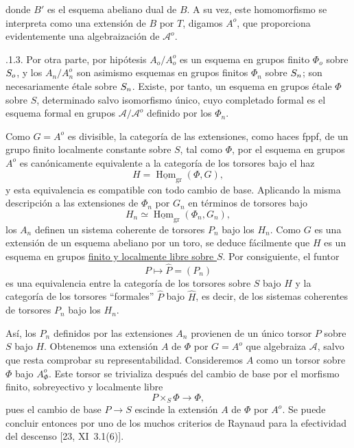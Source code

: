 
donde $B'$ es el esquema abeliano dual de $B$. A su vez, este
homomorfismo se interpreta como una extensión de $B$ por $T$, digamos
$A^o$, que proporciona evidentemente una algebraización de
$\mathcal A^o$.

\medskip
{}.1.3. Por otra parte, por hipótesis $A_o/A_o^o$ es un esquema en
grupos finito $\Phi_o$ sobre $\sisi{S}{S_o}$, y los $A_n/A_n^o$ son
asimismo esquemas en grupos finitos $\Phi_n$ sobre $\sisi{S}{S_n}$;
son necesariamente étale sobre $\sisi{S}{S_n}$. Existe, por tanto, un
esquema en grupos étale $\Phi$ sobre $S$, determinado salvo isomorfismo
único, cuyo completado formal es el esquema formal en grupos
$\mathcal A/\mathcal A^o$ definido por los $\Phi_n$.

Como $G=A^o$ es divisible, la categoría de las extensiones, como haces
fppf, de un grupo finito localmente constante sobre $S$, tal como
$\Phi$, por el esquema en grupos $A^o$ es canónicamente equivalente a
la categoría de los torsores bajo el haz
\[
 H=\underline{\operatorname{Hom}}_{\mathrm{gr}}(\Phi,G),
\]
y esta equivalencia es compatible con todo cambio de base. Aplicando la
misma descripción a las extensiones de $\Phi_n$ por $G_n$ en términos
de torsores bajo
\[
 H_n\simeq
 \underline{\operatorname{Hom}}_{\mathrm{gr}}(\Phi_n,G_n),
\]
los $A_n$ definen un sistema coherente de torsores $P_n$ bajo los
$H_n$. Como $G$ es una extensión de un esquema abeliano por un toro, se
deduce fácilmente que $H$ es un esquema en grupos \underline{finito y
localmente libre sobre $S$}. Por consiguiente, el funtor
\[
 P\longmapsto\widehat P=(P_n)
\]
es una equivalencia entre la categoría de los torsores sobre $S$ bajo
$H$ y la categoría de los torsores ``formales'' $\widehat P$ bajo
$\widehat H$, es decir, de los sistemas coherentes de torsores $P_n$
bajo los $H_n$.


Así, los $P_n$ definidos por las extensiones $A_n$ provienen de un
único torsor $P$ sobre $S$ bajo $H$. Obtenemos una extensión $A$ de
$\Phi$ por $G=A^o$ que algebraiza $\mathcal A$, salvo que resta comprobar
su representabilidad. Consideremos $A$ como un torsor sobre $\Phi$ bajo
$A^o_\Phi$. Este torsor se trivializa después del cambio de base por el
morfismo finito, sobreyectivo y localmente libre
\[
 P\times_S\Phi\longrightarrow\Phi,
\]
pues el cambio de base $P\longrightarrow S$ escinde la extensión $A$
de $\Phi$ por $A^o$. Se puede concluir entonces por uno de los muchos
criterios de Raynaud para la efectividad del descenso
[23, XI~3.1(6)].

